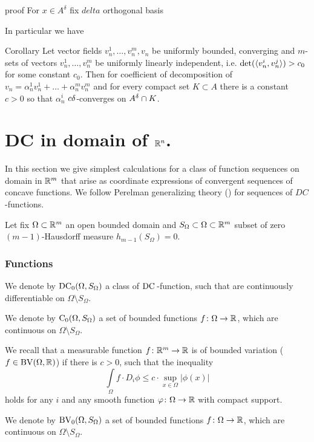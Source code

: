 \documentclass[a4paper,10pt]{article}
\begin{document}
{\parit proof}
For $x\in A^\delta$ fix $delta$ orthogonal basis





In particular we have
\begin{thm}{Corollary}\label{cor:cdeltacoeff}
Let vector fields $v_n^1,\dots, v_n^m, v_n$ be
uniformly bounded, converging
 and $m$-sets of vectors
$v_n^1,\dots, v_n^m$ be uniformly linearly independent,
i.e. $\det(\langle v_n^i, v_n^j\rangle)>c_0$
for some constant $c_0$.
Then for coefficient of decomposition
of $v_n=\alpha_n^1 v_n^1+\dots+\alpha_n^m v_n^m$
 and for every compact
set $K\subset A$ there is a constant $c>0$ so that
$\alpha_n^i$ $c\delta$-converges on $A^\delta\cap K$.
\end{thm}

\section{DC in domain of $\mathbb{R}^n$.}\label{sec:DC}

In this section we give simplest calculations for  a class of function sequences on domain in $\mathbb{R}^m$ 
 that arise as coordinate expressions of  convergent sequences
 of concave functions.
 We follow Perelman generalizing theory (\cite{}) for sequences
 of $DC$-functions.
 
Let fix $\Omega\subset \mathbb{R}^m$  an open bounded domain
and
 $S_\Omega\subset\Omega\subset\mathbb{R}^m $ subset of
zero $(m-1)$-Hausdorff measure $h_{m-1}(S_\Omega)=0$.


\subsubsection{Functions}
We denote by  $\operatorname{DC_0}(\Omega,S_\Omega)$ a class of
 $\mathrm{DC\,}$-function, such  that are continuously differentiable on
$\Omega\setminus S_\Omega$.


We denote by $\operatorname{C_0}(\Omega,S_\Omega)$ a set of bounded functions
$f\colon\Omega\to\mathbb{R}$, which are continuous on $\Omega\setminus S_\Omega$.


We recall that a measurable function $f\colon\mathbb{R}^m\to \mathbb{R}$ is of
bounded variation
 ($f\in\operatorname{BV}(\Omega,\mathbb{R})$) if there is  $c>0$,
such that  the inequality
$$\int\limits_\Omega f\cdot D_i\phi
\le
 c\cdot\sup_{x\in\Omega}|\phi(x)|$$
holds
for any $i$ and any smooth function $\varphi\colon\Omega\to \mathbb{R}$ with compact support.



We denote by $\operatorname{BV_0}(\Omega,S_\Omega)$ a set of bounded functions
$f\colon\Omega\to\mathbb{R}$, which are continuous on $\Omega\setminus S_\Omega$.
\end{document}
